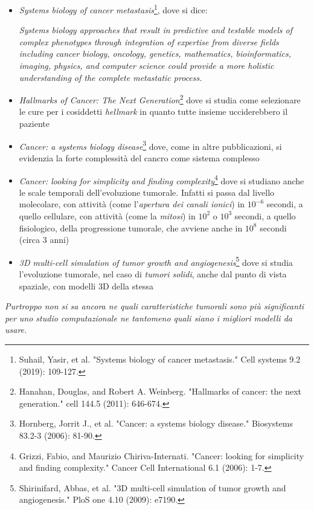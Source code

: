 \documentclass[a4paper,12pt, oneside]{book}
\begin{document}
\begin{itemize}
  \item \textit{Systems biology of cancer metastasis}\footnote{Suhail, Yasir, et
    al. "Systems biology of cancer metastasis." Cell systems 9.2 (2019):
    109-127.}, dove si dice:
  \begin{center}
    \textit{Systems biology approaches that result in predictive and testable
      models of complex phenotypes through integration of expertise from diverse
      fields including cancer biology, oncology, genetics, mathematics,
      bioinformatics, imaging, physics, and computer science could provide a
      more holistic understanding of the complete metastatic process.} 
  \end{center}
  \item \textit{Hallmarks of Cancer: The Next Generation}\footnote{Hanahan,
    Douglas, and Robert A. Weinberg. "Hallmarks of cancer: the next generation."
    cell 144.5 (2011): 646-674.} dove si studia come selezionare le cure per i
  cosiddetti \textit{hellmark} in
  quanto tutte insieme ucciderebbero il paziente
  \item \textit{Cancer: a systems biology disease}\footnote{Hornberg, Jorrit J.,
    et al. "Cancer: a systems biology disease." Biosystems 83.2-3 (2006):
    81-90.} dove, come in altre pubblicazioni, si evidenzia la forte
  complessità del cancro come sistema complesso
  \item \textit{Cancer: looking for simplicity and finding
    complexity}\footnote{Grizzi, Fabio, and Maurizio Chiriva-Internati. "Cancer:
    looking for simplicity and finding complexity." Cancer Cell International
    6.1 (2006): 1-7.} dove si studiano anche le scale temporali dell'evoluzione
  tumorale. Infatti si passa dal livello molecolare, con attività (come
  l'\textit{apertura dei canali ionici}) in $10^{-6}$
  secondi, a quello cellulare, con attività (come la \textit{mitosi}) in
  $10^{2}$ o $10^3$ secondi, a 
  quello fisiologico, della progressione tumorale, che avviene anche in $10^8$
  secondi (circa 3 anni) 
  \item \textit{3D multi-cell simulation of tumor growth and
    angiogenesis}\footnote{Shirinifard, Abbas, et al. "3D multi-cell simulation
    of tumor growth and angiogenesis." PloS one 4.10 (2009): e7190.} dove si
  studia l'evoluzione tumorale, nel caso di \textit{tumori solidi}, anche dal
  punto di vista spaziale, con modelli 3D della stessa
\end{itemize}
\textit{Purtroppo non si sa ancora ne quali caratteristiche tumorali sono più
  significanti per uno studio computazionale ne tantomeno quali siano i migliori
  modelli da usare.}\\
\end{document}

